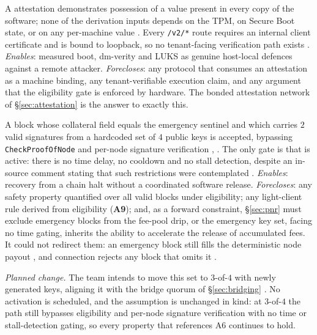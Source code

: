 \begin{assumption}
\label{asm:a5-attestation}
\shipped A \fluxsas{} attestation demonstrates possession of a value present in every copy of the
software; none of the derivation inputs depends on the TPM, on Secure Boot state, or on any
per-machine value . Every
\texttt{/v2/*} route requires an internal client certificate and is bound to loopback, so no
tenant-facing verification path exists .
\emph{Enables}: measured boot, dm-verity and LUKS as genuine host-local defences against a remote
attacker. \emph{Forecloses}: any protocol that consumes an attestation as a machine binding, any
tenant-verifiable execution claim, and any argument that the eligibility gate is enforced by
hardware. The bonded attestation network of \S\ref{sec:attestation} is the answer to exactly this.
\end{assumption}

\begin{assumption}
\label{asm:a6-emergency}
\shipped A block whose collateral field equals the emergency sentinel and which carries $2$ valid
signatures from a hardcoded set of $4$ public keys is accepted, bypassing \texttt{Check\allowbreak{}Proof\allowbreak{}Of\allowbreak{}Node}
and per-node signature verification ,
. The only gate is that \PoN{} is active: there is no time
delay, no cooldown and no stall detection, despite an in-source comment stating that such
restrictions were contemplated .
\emph{Enables}: recovery from a chain halt without a coordinated software release.
\emph{Forecloses}: any safety property quantified over all valid blocks under \PoN{} eligibility; any
light-client rule derived from eligibility (\textbf{A9}); and, as a forward constraint,
\S\ref{sec:pnr} must exclude emergency blocks from the fee-pool drip, or the emergency key set,
facing no time gating, inherits the ability to accelerate the release of accumulated fees. It could
not redirect them: an emergency block still fills the deterministic node payout
, and connection rejects any block that omits it
.

\emph{Planned change.} The team intends to move this set to $3$-of-$4$ with newly generated keys,
aligning it with the bridge quorum of \S\ref{sec:bridging} \planned
{}. No activation is scheduled, and the assumption is
unchanged in kind: at $3$-of-$4$ the path still bypasses \PoN{} eligibility and per-node signature
verification with no time or stall-detection gating, so every property that references A6 continues
to hold.
\end{assumption}

